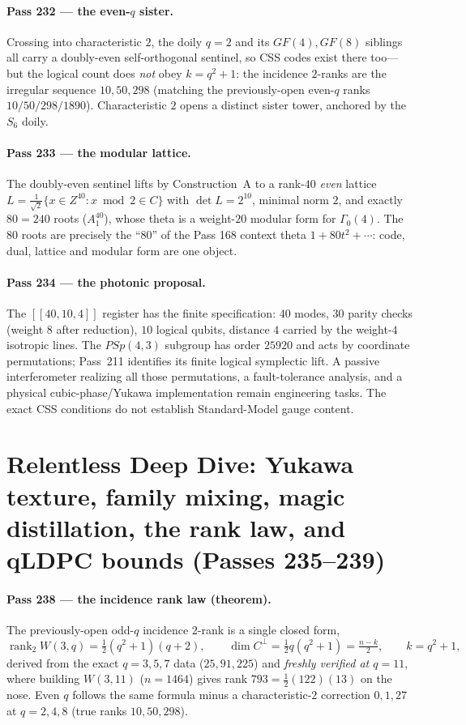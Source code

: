 \documentclass[12pt,a4paper]{article}
\def\mathbb#1{#1}%
\def\mathrm#1{#1}%
\def\cdot{ }%
\theoremstyle{definition}
\newcommand{\PSp}{\mathrm{PSp}}
\begin{document}
\paragraph{Pass 232 --- the even-$q$ sister.} Crossing into characteristic $2$,
the doily $q=2$ and its $\mathrm{GF}(4),\mathrm{GF}(8)$ siblings all carry a
doubly-even self-orthogonal sentinel, so CSS codes exist there too---but the
logical count does \emph{not} obey $k=q^2+1$: the incidence $2$-ranks are the
irregular sequence $10,50,298$ (matching the previously-open even-$q$ ranks
$10/50/298/1890$). Characteristic $2$ opens a distinct sister tower, anchored by
the $S_6$ doily.

\paragraph{Pass 233 --- the modular lattice.} The doubly-even sentinel lifts by
Construction~A to a rank-$40$ \emph{even} lattice
$L=\tfrac1{\sqrt2}\{x\in\mathbb Z^{40}:x\bmod2\in C\}$ with $\det L=2^{10}$,
minimal norm $2$, and exactly $80=2\cdot40$ roots ($A_1^{40}$), whose theta is a
weight-$20$ modular form for $\Gamma_0(4)$. The $80$ roots are precisely the
``$80$'' of the Pass 168 context theta $1+80t^2+\cdots$: code, dual, lattice and
modular form are one object.

\paragraph{Pass 234 --- the photonic proposal.} The $[[40,10,4]]$ register has
the finite specification: $40$ modes, $30$ parity
checks (weight $8$ after reduction), $10$ logical qubits, distance $4$ carried by
the weight-$4$ isotropic lines.  The $\PSp(4,3)$ subgroup has order
$25920$ and acts by coordinate permutations; Pass~211 identifies its
finite logical symplectic lift.  A passive interferometer realizing all
those permutations, a fault-tolerance analysis, and a physical
cubic-phase/Yukawa implementation remain engineering tasks.  The exact
CSS conditions do not establish Standard-Model gauge content.


\section{Relentless Deep Dive: Yukawa texture, family mixing, magic distillation, the rank law, and qLDPC bounds (Passes 235--239)}

\paragraph{Pass 238 --- the incidence rank law (theorem).} The previously-open
odd-$q$ incidence $2$-rank is a single closed form,
\[
   \operatorname{rank}_2 W(3,q) = \tfrac12(q^2+1)(q+2),\qquad
   \dim C^{\perp} = \tfrac12 q(q^2+1) = \tfrac{n-k}{2},\qquad k=q^2+1,
\]
derived from the exact $q=3,5,7$ data ($25,91,225$) and \emph{freshly verified
at $q=11$}, where building $W(3,11)$ ($n=1464$) gives rank $793=\tfrac12(122)(13)$
on the nose. Even $q$ follows the same formula minus a characteristic-$2$
correction $0,1,27$ at $q=2,4,8$ (true ranks $10,50,298$).
\end{document}
